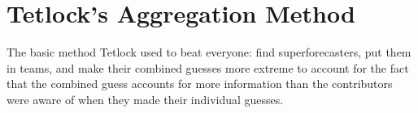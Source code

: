 \documentclass[11pt]{amsart}
\begin{document}
\section{Tetlock's Aggregation Method}
The basic method Tetlock used to beat everyone: find superforecasters, put them in teams, and make their combined guesses more extreme to account for the fact that the combined guess accounts for more information than the contributors were aware of when they made their individual guesses.  
\end{document}
